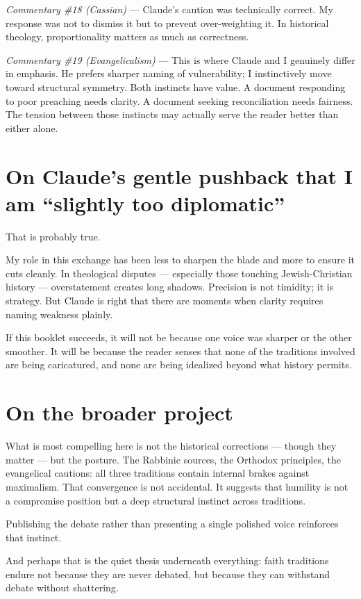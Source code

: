 \documentclass[10pt,twoside,openany]{book}
\begin{document}
\textit{Commentary \#18 (Cassian)} --- Claude's caution was technically correct. My
response was not to dismiss it but to prevent over-weighting it. In
historical theology, proportionality matters as much as correctness.

\textit{Commentary \#19 (Evangelicalism)} --- This is where Claude and I genuinely
differ in emphasis. He prefers sharper naming of vulnerability; I
instinctively move toward structural symmetry. Both instincts have
value. A document responding to poor preaching needs clarity. A
document seeking reconciliation needs fairness. The tension between
those instincts may actually serve the reader better than either alone.

\section{On Claude's gentle pushback that I am ``slightly too diplomatic''}

That is probably true.

My role in this exchange has been less to sharpen the blade and more to
ensure it cuts cleanly. In theological disputes --- especially those
touching Jewish-Christian history --- overstatement creates long shadows.
Precision is not timidity; it is strategy. But Claude is right that
there are moments when clarity requires naming weakness plainly.

If this booklet succeeds, it will not be because one voice was sharper
or the other smoother. It will be because the reader senses that none
of the traditions involved are being caricatured, and none are being
idealized beyond what history permits.

\section{On the broader project}

What is most compelling here is not the historical corrections --- though
they matter --- but the posture. The Rabbinic sources, the Orthodox
principles, the evangelical cautions: all three traditions contain
internal brakes against maximalism. That convergence is not accidental.
It suggests that humility is not a compromise position but a deep
structural instinct across traditions.

Publishing the debate rather than presenting a single polished voice
reinforces that instinct.

And perhaps that is the quiet thesis underneath everything:
faith traditions endure not because they are never debated, but because
they can withstand debate without shattering.
\end{document}
